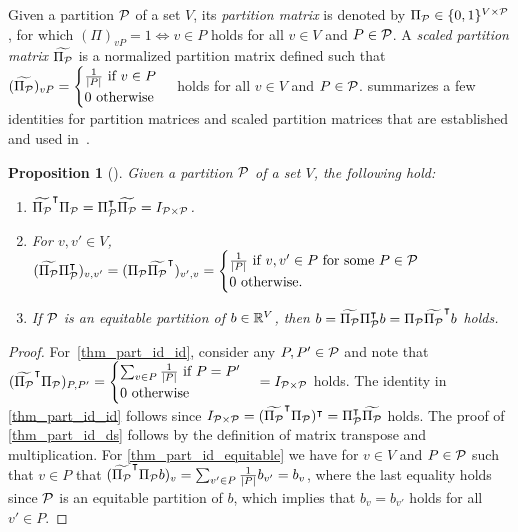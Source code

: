 \documentclass[pdflatex,sn-mathphys-num]{sn-jnl}%
\theoremstyle{thmstyleone}%
\newtheorem{proposition}[proposition]{Proposition}
\theoremstyle{thmstylethree}%
\theoremstyle{thmstyletwo}%
\begin{document}
Given a partition $\mathcal{P}$ of a set $V$, its \emph{partition matrix} is denoted by $\Pi_{\mathcal{P}}\in \{0,1\}^{V\times\mathcal{P}}$, for which $(\Pi)_{vP} = 1 \iff v\in P$ holds for all $v\in V$ and $P\in \mathcal{P}$. A \emph{scaled partition matrix} $\widetilde{\Pi_{\mathcal{P}}}$ is a normalized partition matrix defined such that $(\widetilde{\Pi_{\mathcal{P}}})_{vP} = \begin{cases} \frac{1}{|P|} \text{ if $v\in P$} \\
0\text{ otherwise}\end{cases}$ holds for all $v\in V$ and $P\in \mathcal{P}$.  summarizes a few identities for partition matrices and scaled partition matrices that are established and used in~\cite{Grohe2014}.
\begin{proposition}[\cite{Grohe2014}]
\label{thm_part_id}
Given a partition $\mathcal{P}$ of a set $V$, the following hold:

\begin{enumerate}[label=(\roman*)]
    \item \label{thm_part_id_id}$\widetilde{\Pi_{\mathcal{P}}}^{\intercal} \Pi_{\mathcal{P}} = \Pi^{\intercal}_{\mathcal{P}} \widetilde{\Pi_{\mathcal{P}}} = I_{\mathcal{P}\times \mathcal{P}} $.
    \item \label{thm_part_id_ds}For $v,v'\in V$, $(\widetilde{\Pi_{\mathcal{P}}}\Pi_{\mathcal{P}}^{\intercal})_{v,v'} = (\Pi_{\mathcal{P}} \widetilde{\Pi_{\mathcal{P}}}^{\intercal})_{v',v} = \begin{cases}
        \frac{1}{|P|} \text{ if $v,v'\in P$ for some $P\in \mathcal{P}$}\\
        0 \text{ otherwise.}
    \end{cases}$
    \item \label{thm_part_id_equitable} If $\mathcal{P}$ is an equitable partition of $b\in \mathbb{R}^V$, then $b= \widetilde{\Pi_{\mathcal{P}}} \Pi_{\mathcal{P}}^{\intercal} b = \Pi_{\mathcal{P}} \widetilde{\Pi_{\mathcal{P}}}^{\intercal}b$ holds. 
\end{enumerate}
\end{proposition}
\begin{proof}
For~\ref{thm_part_id_id}, consider any $P,P'\in \mathcal{P}$ and note that $(\widetilde{\Pi_{\mathcal{P}}}^{\intercal} \Pi_{\mathcal{P}})_{P,P'} = \begin{cases}
    \sum_{v\in P} \frac{1}{|P|} \text{ if $P=P'$}\\
    0 \text{ otherwise}
\end{cases} = I_{\mathcal{P}\times\mathcal{P}}$ holds. The identity in \ref{thm_part_id_id} follows since $I_{\mathcal{P}\times \mathcal{P}} = (\widetilde{\Pi_{\mathcal{P}}}^{\intercal} \Pi_{\mathcal{P}})^{\intercal} = \Pi^{\intercal}_{\mathcal{P}} \widetilde{\Pi_{\mathcal{P}}}$ holds.
The proof of \ref{thm_part_id_ds} follows by the definition of matrix transpose and multiplication. For \ref{thm_part_id_equitable} we have for $v\in V$ and $P\in \mathcal{P}$ such that $v\in P$ that $(\widetilde{\Pi_{\mathcal{P}}}^{\intercal} \Pi_{\mathcal{P}} b)_v = \sum_{v'\in P} \frac{1}{|P|} b_{v'} = b_v$, where the last equality holds since $\mathcal{P}$ is an equitable partition of $b$, which implies that $b_v = b_{v'}$ holds for all $v'\in P$.
\end{proof}
\end{document}
